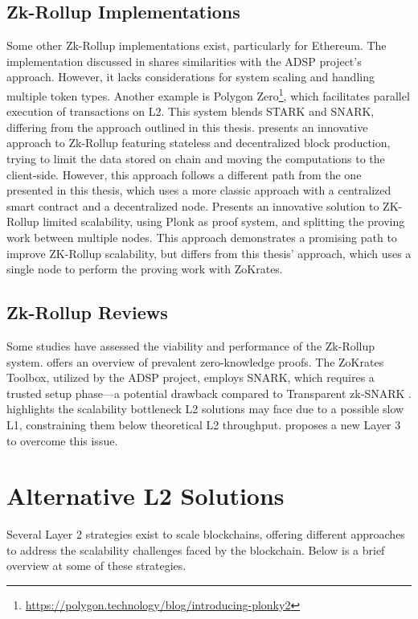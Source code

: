 \subsection{Zk-Rollup Implementations}
Some other Zk-Rollup implementations exist, particularly for Ethereum. The implementation discussed in \cite{dinh_implementation_2023} shares similarities with the ADSP project's approach. However, it lacks considerations for system scaling and handling multiple token types. Another example is Polygon Zero\footnote{\url{https://polygon.technology/blog/introducing-plonky2}}, which facilitates parallel execution of transactions on L2. This system blends STARK and SNARK, differing from the approach outlined in this thesis. \cite{rybakken_intmax2_2023} presents an innovative approach to Zk-Rollup featuring stateless and decentralized block production, trying to limit the data stored on chain and moving the computations to the client-side. However, this approach follows a different path from the one presented in this thesis, which uses a more classic approach with a centralized smart contract and a decentralized node. \cite{liu_pianist_2023} Presents an innovative solution to ZK-Rollup limited scalability, using Plonk as proof system, and splitting the proving work between multiple nodes. This approach demonstrates a promising path to improve ZK-Rollup scalability, but differs from this thesis' approach, which uses a single node to perform the proving work with ZoKrates.

\subsection{Zk-Rollup Reviews}
Some studies have assessed the viability and performance of the Zk-Rollup system. \cite{capko_state_2022} offers an overview of prevalent zero-knowledge proofs. The ZoKrates Toolbox, utilized by the ADSP project, employs SNARK, which requires a trusted setup phase—a potential drawback compared to Transparent zk-SNARK \cite{zhou_overview_2022}. \cite{neiheiser_practical_2023} highlights the scalability bottleneck L2 solutions may face due to a possible slow L1, constraining them below theoretical L2 throughput. \cite{starkware_fractal_2021} proposes a new Layer 3 to overcome this issue.

\section{Alternative L2 Solutions}
Several Layer 2 strategies exist to scale blockchains, offering different approaches to address the scalability challenges faced by the blockchain. Below is a brief overview at some of these strategies.

